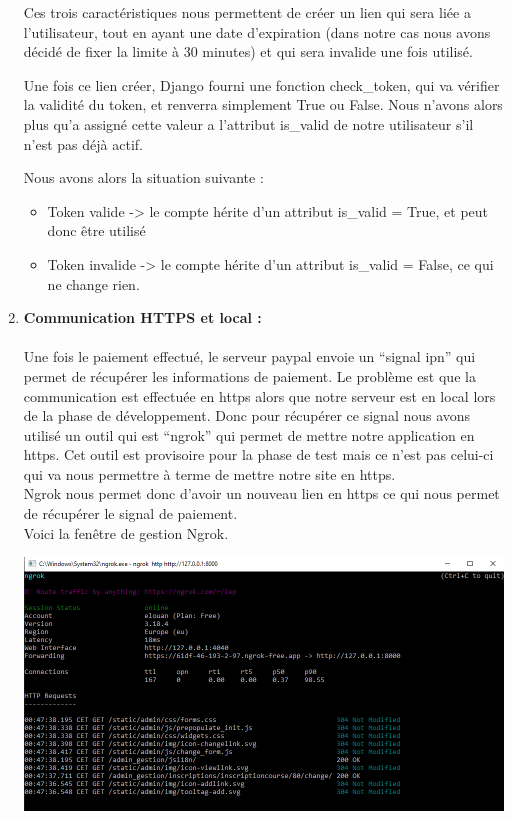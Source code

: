 \documentclass[12pt]{article} %
\begin{document}
\begin{enumerate}
Ces trois caractéristiques nous permettent de créer un lien qui sera liée a l'utilisateur, tout en ayant une date d'expiration (dans notre cas nous avons décidé de fixer la limite à 30 minutes) et qui sera invalide une fois utilisé.

Une fois ce lien créer, Django fourni une fonction check\_token, qui va vérifier la validité du token, et renverra simplement True ou False. Nous n'avons alors plus qu'a assigné cette valeur a l'attribut is\_valid de notre utilisateur s'il n'est pas déjà actif.

	Nous avons alors la situation suivante : 
	\begin{itemize}
		\item Token valide -> le compte hérite d'un attribut is\_valid = True, et peut donc être utilisé
		\item Token invalide -> le compte hérite d'un attribut is\_valid = False, ce qui ne change rien.
	\end{itemize}
		
		
            \item \textbf{Communication HTTPS et local :}\\\\
                Une fois le paiement effectué, le serveur paypal envoie un “signal ipn” qui permet de récupérer les informations de paiement. Le problème est que la communication est effectuée en https alors que notre serveur est en local lors de la phase de développement. Donc pour récupérer ce signal nous avons utilisé un outil qui est “ngrok” qui permet de mettre notre application en https. Cet outil est provisoire pour la phase de test mais ce n’est pas celui-ci qui va nous permettre à terme de mettre notre site en https.\\
                Ngrok nous permet donc d’avoir un nouveau lien en https ce qui nous permet de récupérer le signal de paiement.\\ Voici la fenêtre de gestion Ngrok.


                \includegraphics[scale=0.6]{images/Capture_M1Ngrok.PNG}

        \end{enumerate}
    
\end{document}
